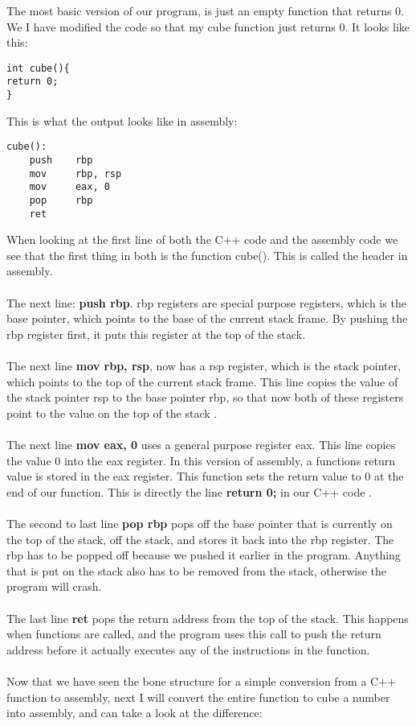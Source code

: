 \documentclass{article}
\theoremstyle{theorem}
\theoremstyle{definition}
\theoremstyle{remark}
\begin{document}
The most basic version of our program, is just an empty function that returns 0. We I have modified the code so that my cube function just returns 0. It looks like this:

\begin{lstlisting}
int cube(){
return 0;
}
\end{lstlisting}

This is what the output looks like in assembly:
\\

\begin{lstlisting}
cube():
    push    rbp
    mov     rbp, rsp
    mov     eax, 0
    pop     rbp
    ret
\end{lstlisting} \cite{GODBOLT}
When looking at the first line of both the C++ code and the assembly code we see that the first thing in both is the function cube()\cite{FASS}. This is called the header in assembly.
\\
\\
The next line: \textbf{push rbp}. rbp registers are special purpose registers, which is the base pointer, which points to the base of the current stack frame. By pushing the rbp register first, it puts this register at the top of the stack.
\\
\\
The next line \textbf{mov rbp, rsp}, now has a rsp register, which is the stack pointer, which points to the top of the current stack frame\cite{ASRC}. This line copies the value of the stack pointer rsp to the base pointer rbp, so that now both of these registers point to the value on the top of the stack \cite{SARC}.
\\
\\
The next line \textbf{mov eax, 0} uses a general purpose register eax. This line copies the value 0 into the eax register. In this version of assembly, a functions return value is stored in the eax register. This function sets the return value to 0 at the end of our function. This is directly the line \textbf{return 0;} in our C++ code \cite{ASRC}.
\\
\\
The second to last line \textbf{pop rbp} pops off the base pointer that is currently on the top of the stack, off the stack, and stores it back into the rbp register. The rbp has to be popped off because we pushed it earlier in the program. Anything that is put on the stack also has to be removed from the stack, otherwise the program will crash.
\\
\\
The last line \textbf{ret} pops the return address from the top of the stack. This happens when functions are called, and the program uses this call to push the return address before it actually executes any of the instructions in the function. \\
\\
Now that we have seen the bone structure for a simple conversion from a C++ function to assembly, next I will convert the entire function to cube a number into assembly, and can take a look at the difference:
\end{document}

